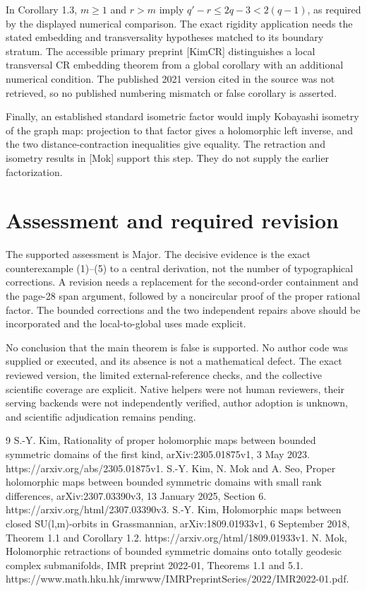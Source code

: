 \documentclass[10pt]{article}
\begin{document}
In Corollary 1.3, \(m\ge1\) and \(r>m\) imply \(q'-r\le2q-3<2(q-1)\), as required by the displayed numerical comparison. The exact rigidity application needs the stated embedding and transversality hypotheses matched to its boundary stratum. The accessible primary preprint [KimCR] distinguishes a local transversal CR embedding theorem from a global corollary with an additional numerical condition. The published 2021 version cited in the source was not retrieved, so no published numbering mismatch or false corollary is asserted.\par
Finally, an established standard isometric factor would imply Kobayashi isometry of the graph map: projection to that factor gives a holomorphic left inverse, and the two distance-contraction inequalities give equality. The retraction and isometry results in [Mok] support this step. They do not supply the earlier factorization.\par
\section*{Assessment and required revision}
The supported assessment is Major. The decisive evidence is the exact counterexample (1)–(5) to a central derivation, not the number of typographical corrections. A revision needs a replacement for the second-order containment and the page-28 span argument, followed by a noncircular proof of the proper rational factor. The bounded corrections and the two independent repairs above should be incorporated and the local-to-global uses made explicit.\par
No conclusion that the main theorem is false is supported. No author code was supplied or executed, and its absence is not a mathematical defect. The exact reviewed version, the limited external-reference checks, and the collective scientific coverage are explicit. Native helpers were not human reviewers, their serving backends were not independently verified, author adoption is unknown, and scientific adjudication remains pending.\par
9 S.-Y. Kim, Rationality of proper holomorphic maps between bounded symmetric domains of the first kind, arXiv:2305.01875v1, 3 May 2023. https://arxiv.org/abs/2305.01875v1. S.-Y. Kim, N. Mok and A. Seo, Proper holomorphic maps between bounded symmetric domains with small rank differences, arXiv:2307.03390v3, 13 January 2025, Section 6. https://arxiv.org/html/2307.03390v3. S.-Y. Kim, Holomorphic maps between closed SU(l,m)-orbits in Grassmannian, arXiv:1809.01933v1, 6 September 2018, Theorem 1.1 and Corollary 1.2. https://arxiv.org/html/1809.01933v1. N. Mok, Holomorphic retractions of bounded symmetric domains onto totally geodesic complex submanifolds, IMR preprint 2022-01, Theorems 1.1 and 5.1. https://www.math.hku.hk/imrwww/IMRPreprintSeries/2022/IMR2022-01.pdf.\par
\end{document}
